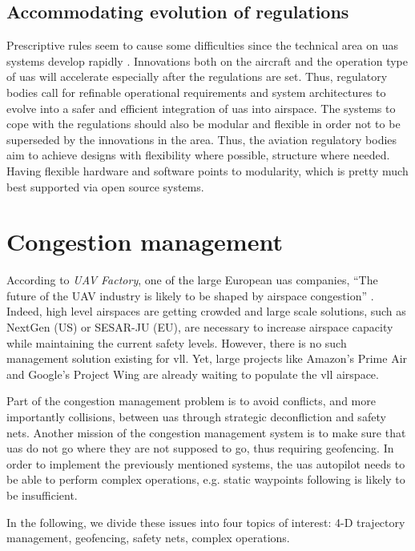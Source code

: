 \subsection{Accommodating evolution of regulations}
Prescriptive rules seem to cause some difficulties since the technical area on \gls{uas} 
systems develop rapidly \cite{A_NPA_EASA2015}. Innovations both on the aircraft and the operation 
type of \gls{uas} will accelerate especially after the regulations are set. Thus, regulatory 
bodies call for refinable operational requirements and system architectures to evolve into 
a safer and efficient integration of \gls{uas} into airspace. The systems to cope with the 
regulations should also be modular and flexible in order not to be superseded by the 
innovations in the area. 
Thus, the aviation regulatory bodies aim to achieve designs with flexibility where possible, 
structure where needed. Having flexible hardware and software points to modularity, which 
is pretty much best supported via open source systems.



\section{Congestion management}\label{ch2:congestion}

According to \textit{UAV Factory}, one of the large European \gls{uas} companies, 
``The future of the UAV industry is likely to be shaped by airspace congestion'' 
\cite{europe_report_civilian_drone}. Indeed, high level airspaces are getting crowded 
and large scale solutions, such as NextGen (US) or SESAR-JU (EU), are necessary to 
increase airspace capacity while maintaining the current safety levels. However, there is 
no such management solution existing for \gls{vll}. Yet, large projects like Amazon's 
Prime Air and Google's Project Wing are already waiting to populate the \gls{vll} airspace.	
	
Part of the congestion management problem is to avoid conflicts, and more importantly 
collisions, between \gls{uas} through strategic deconfliction and safety nets.
Another mission of the congestion management system is to make sure that \gls{uas} 
do not go where they are not supposed to go, thus requiring geofencing. In order to implement 
the previously mentioned systems, the \gls{uas} autopilot needs to be able to perform complex 
operations, e.g. static waypoints following is likely to be insufficient.

In the following, we divide these issues into four topics of interest: 4-D trajectory management, 
geofencing, safety nets, complex operations.
	
